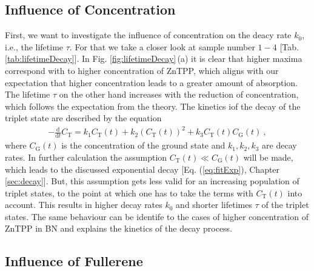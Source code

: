 \subsection{Influence of Concentration}
\label{sub:concentration}

First, we want to investigate the influence of concentration on the deacy rate $k_0$, i.e., the lifetime $\tau$. For that we take a closer look at sample number $1-4$ [Tab. \ref{tab:lifetimeDecay}]. In Fig. \ref{fig:lifetimeDecay}\,(a) it is clear that higher maxima correspond with to higher concentration of ZnTPP, which aligns with our expectation that higher concentration leads to a greater amount of absorption. The lifetime $\tau$ on the other hand increases with the reduction of concentration, which follows the expectation from the theory. The kinetics iof the decay of the triplet state are described by the equation
\begin{gather}
    -\frac{\mathrm{d}}{\mathrm{d}t} C_\mathrm{T} = k_1 C_\mathrm{T}(t) + k_2(C_\mathrm{T}(t))^2 + k_3C_\mathrm{T}(t)C_\mathrm{G}(t)~,
    \label{eq:kineticsTriplet}
\end{gather}
where $C_\mathrm{G}(t)$ is the concentration of the ground state and $k_1, k_2, k_3$ are decay rates. In further calculation the assumption $C_\mathrm{T}(t) \ll C_\mathrm{G}(t)$ will be made, which leads to the discussed exponential decay [Eq. (\ref{eq:fitExp}), Chapter \ref{sec:decay}]. But, this assumption gets less valid for an increasing population of triplet states, to the point at which one has to take the terms with $C_\mathrm{T}(t)$ into account. This results in higher decay rates $k_0$ and shorter lifetimes $\tau$ of the triplet states. The same behaviour can be identife to the cases of higher concentration of ZnTPP in BN and explains the kinetics of the decay process.

\subsection{Influence of Fullerene }
\label{sub:fullerene}

